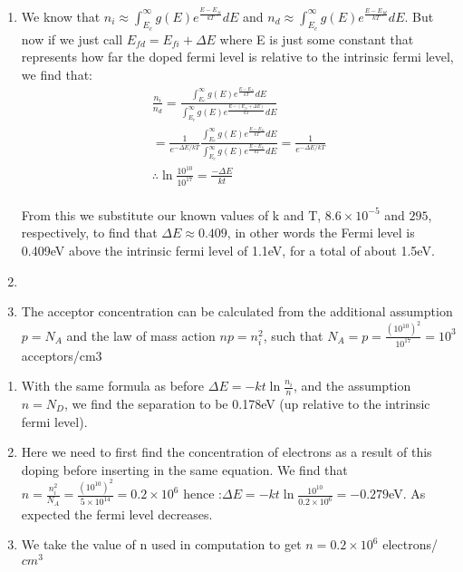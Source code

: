 \documentclass{article}
\begin{document}
\begin{prob}
	\begin{enumerate}
		\item We know that $n_i\approx\int_{E_c}^{\infty}g(E)e^{\frac{E-E_{fi}}{kT}}dE$ and $n_d\approx\int_{E_c}^{\infty}g(E)e^{\frac{E-E_{fd}}{kT}}dE$. But now if we just call $E_{fd}=E_{fi}+\Delta E$ where E is just some constant that represents how far the doped fermi level is relative to the intrinsic fermi level, we find that:  
	\[\begin{split} 
		\frac{n_i}{n_d}=\frac{\int_{E_c}^{\infty}g(E)e^{\frac{E-E_{fi}}{kT}}dE}{\int_{E_c}^{\infty}g(E)e^{\frac{E-(E_{fi}+\Delta E)}{kT}}dE} \\
    =\frac{1}{e^{- \Delta E/kT}}\frac{\int_{E_c}^{\infty}g(E)e^{\frac{E-E_{fi}}{kT}}dE}{\int_{E_c}^{\infty}g(E)e^{\frac{E-E_{fi}}{kT}}dE}=\frac{1}{e^{-\Delta E/kT}} \\
 \therefore \ln{\frac{10^{10}}{10^{17}}} = \frac{-\Delta E}{kt} \\
	\end{split} 
 \]

From this we substitute our known values of k and T, $8.6\times10^{-5}$ and $295$, respectively, to find that $\Delta E\approx0.409$, in other words the Fermi level is 0.409eV above the intrinsic fermi level of 1.1eV, for a total of about 1.5eV. 

        \item {}

        \item The acceptor concentration can be calculated from the additional assumption $p=N_A$ and the law of mass action $np=n_i^2$, such that $N_A=p=\frac{(10^{10})^2}{10^{17}}=10^3$ acceptors/cm3
    \end{enumerate}
\end{prob}

\begin{prob}
\begin{enumerate}
	\item With the same formula as before $\Delta E=-kt\ln\frac{n_i}{n}$, and the assumption $n=N_D$, we find the separation to be 0.178eV (up relative to the intrinsic fermi level). 
	\item Here we need to first find the concentration of electrons as a result of this doping before inserting in the same equation. We find that $n=\frac{n_i^2}{N_A}=\frac{(10^{10})^2}{5\times10^{14}}=0.2\times10^6$ hence :$\Delta E=-kt\ln\frac{10^{10}}{0.2\times10^6}=-0.279$eV. As expected the fermi level decreases.
	\item We take the value of n used in computation to get $n=0.2\times10^6$ electrons/$cm^3$
\end{enumerate}
\end{prob}
\end{document}
